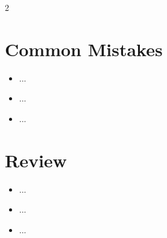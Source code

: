 \documentclass[a4paper,9pt]{extarticle}
\begin{document}
\begin{multicols}{2}
\begin{itemize}
\end{itemize}




\section{Common Mistakes}


\begin{itemize}

\item ...

\item ...

\item ...

\end{itemize}




\section{Review}


\begin{itemize}

\item ...

\item ...

\item ...

\end{itemize}




\end{multicols}
\end{document}

